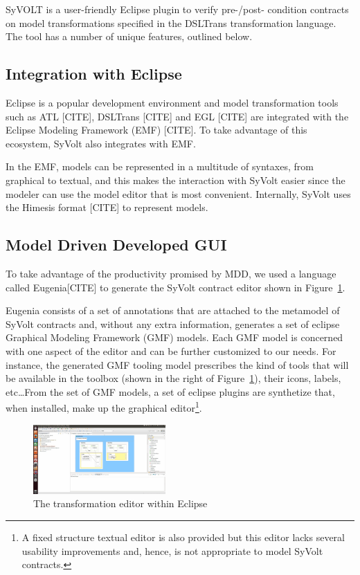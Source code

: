 SyVOLT is a user-friendly Eclipse plugin to verify pre-/post- condition
contracts on model transformations specified in the DSLTrans transformation
language. The tool has a number of unique features, outlined below.

\subsection{Integration with Eclipse}

Eclipse is a popular development environment and model transformation
tools such as ATL [CITE], DSLTrans [CITE] and EGL [CITE] are integrated with the
Eclipse Modeling Framework (EMF) [CITE].
To take advantage of this ecosystem, SyVolt also integrates with EMF.

In the EMF, models can be represented in a multitude of syntaxes, from graphical
to textual, and this makes the interaction with SyVolt easier since the modeler
can use the model editor that is most convenient. Internally, SyVolt uses 
the Himesis format [CITE] to represent models.

\subsection{Model Driven Developed GUI}

To take advantage of the productivity promised by MDD, we used a language called
Eugenia[CITE] to generate the SyVolt contract editor shown in
Figure~\ref{fig:eclipse_frontend}.

Eugenia consists of a set of annotations that are attached to the metamodel of
SyVolt contracts and, without any extra information, generates a set of eclipse
Graphical Modeling Framework (GMF) models.
Each GMF model is concerned with one aspect of the editor and can be further
customized to our needs.
For instance, the generated GMF tooling model prescribes the kind of tools that
will be available in the toolbox (shown in the right of
Figure~\ref{fig:eclipse_frontend}), their icons, labels, etc\ldots From the set
of GMF models, a set of eclipse plugins are synthetize that, when installed,
make up the graphical editor\footnote{A fixed structure textual editor is also provided but this editor lacks several usability improvements and, hence, is not appropriate to model SyVolt contracts.}.

\begin{figure}
\centering
\includegraphics[width=0.45\textwidth]{figures/eclipse_frontend}
\caption{The transformation editor within Eclipse}
\label{fig:eclipse_frontend}
\end{figure}

